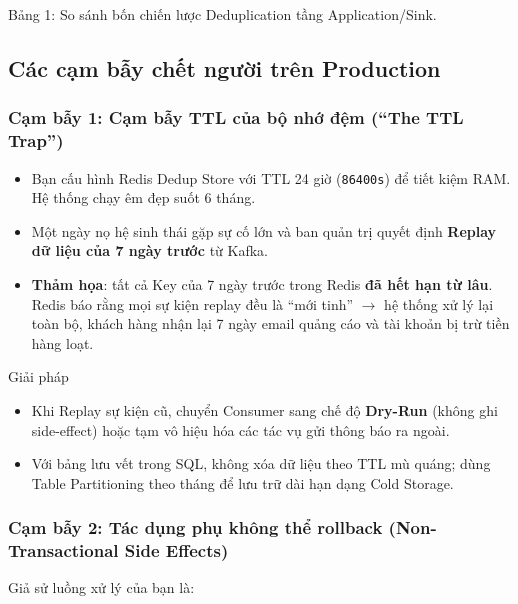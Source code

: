 \documentclass[12pt]{article}
\begin{document}
\begin{captionbelowboxaivn}
Bảng 1: So sánh bốn chiến lược Deduplication tầng Application/Sink.
\end{captionbelowboxaivn}

\subsection{Các cạm bẫy chết người trên Production}

\subsubsection{Cạm bẫy 1: Cạm bẫy TTL của bộ nhớ đệm (``The TTL Trap'')}

\begin{itemize}
    \item Bạn cấu hình Redis Dedup Store với TTL 24 giờ (\texttt{86400s}) để tiết kiệm RAM. Hệ thống chạy êm đẹp suốt 6 tháng.
    \item Một ngày nọ hệ sinh thái gặp sự cố lớn và ban quản trị quyết định \textbf{Replay dữ liệu của 7 ngày trước} từ Kafka.
    \item \textbf{Thảm họa}: tất cả Key của 7 ngày trước trong Redis \textbf{đã hết hạn từ lâu}. Redis báo rằng mọi sự kiện replay đều là ``mới tinh'' $\rightarrow$ hệ thống xử lý lại toàn bộ, khách hàng nhận lại 7 ngày email quảng cáo và tài khoản bị trừ tiền hàng loạt.
\end{itemize}

\begin{guidelinebox}{Giải pháp}
\begin{itemize}
    \item Khi Replay sự kiện cũ, chuyển Consumer sang chế độ \textbf{Dry-Run} (không ghi side-effect) hoặc tạm vô hiệu hóa các tác vụ gửi thông báo ra ngoài.
    \item Với bảng lưu vết trong SQL, không xóa dữ liệu theo TTL mù quáng; dùng Table Partitioning theo tháng để lưu trữ dài hạn dạng Cold Storage.
\end{itemize}
\end{guidelinebox}

\subsubsection{Cạm bẫy 2: Tác dụng phụ không thể rollback (Non-Transactional Side Effects)}

Giả sử luồng xử lý của bạn là:
\end{document}
